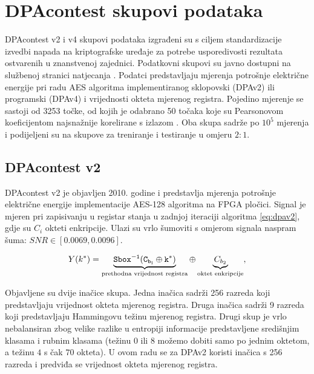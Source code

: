 \documentclass[times, utf8, numeric, diplomski]{fer}
\def\SBOXi#1{\tt Sbox^{-1}(#1)}
\begin{document}

\section{DPAcontest skupovi podataka}
\label{sec:dpa_datasets}
DPAcontest v2 i v4 skupovi podataka izgrađeni su s ciljem standardizacije izvedbi napada na kriptografske uređaje za potrebe usporedivosti rezultata ostvarenih u znanstvenoj zajednici. Podatkovni skupovi su javno dostupni na službenoj stranici natjecanja \citep{dpa}. Podatci predstavljaju mjerenja potrošnje električne energije pri radu AES algoritma implementiranog sklopovski (DPAv2) ili programski (DPAv4) i vrijednosti okteta mjerenog registra. Pojedino mjerenje se sastoji od 3253 točke, od kojih je odabrano 50 točaka koje su Pearsonovom koeficijentom najsnažnije korelirane s izlazom \citep{samiotis_dr}. Oba skupa sadrže po $10^5$ mjerenja i podijeljeni su na skupove za treniranje i testiranje u omjeru $2:1$.


\subsection{DPAcontest v2}
DPAcontest v2 je objavljen 2010. godine i predstavlja mjerenja potrošnje električne energije implementacije AES-128 algoritma na FPGA pločici. Signal je mjeren pri zapisivanju u registar stanja u zadnjoj iteraciji algoritma \eqref{eq:dpav2}, gdje su $C_i$ okteti enkripcije. Ulazi su vrlo šumoviti s omjerom signala naspram šuma: $SNR \in [0.0069, 0.0096]$.

\begin{equation}
\label{eq:dpav2}
Y(k^*) = \underbrace{\SBOXi{C_{b_1} \oplus k^*}}_{\text{prethodna vrijednost registra}} \oplus \underbrace{C_{b_2}}_{\text{oktet enkripcije}},
\end{equation}

Objavljene su dvije inačice skupa. Jedna inačica sadrži 256 razreda koji predstavljaju vrijednost okteta mjerenog registra. Druga inačica sadrži 9 razreda koji predstavljaju Hammingovu težinu mjerenog registra. Drugi skup je vrlo nebalansiran zbog velike razlike u entropiji informacije predstavljene središnjim klasama i rubnim klasama (težinu $0$ ili $8$ možemo dobiti samo po jednim oktetom, a težinu $4$ s čak $70$ okteta). U ovom radu se za DPAv2 koristi inačica s 256 razreda i predviđa se vrijednost okteta mjerenog registra.
\end{document}

